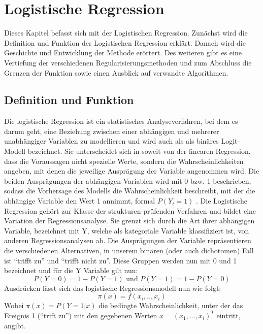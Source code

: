 \chapter{Logistische Regression}
Dieses Kapitel befasst sich mit der Logistischen Regression. Zunächst wird die Definition und Funktion der Logistischen Regression erklärt. Danach wird die Geschichte und Entwicklung der Methode erörtert. Des weiteren gibt es eine Vertiefung der verschiedenen Regularisierungsmethoden und zum Abschluss die Grenzen der Funktion sowie einen Ausblick auf verwandte Algorithmen.
\section{Definition und Funktion}
Die logistische Regression ist ein statistisches Analyseverfahren, bei dem es darum geht, eine Beziehung zwischen einer abhängigen und mehrerer unabhängiger Variablen zu modellieren und wird auch als als binäres Logit-Modell bezeichnet.
Sie unterscheidet sich in soweit von der linearen Regression, dass die Voraussagen nicht spezielle Werte, sondern die Wahrscheinlichkeiten angeben, mit denen die jeweilige Ausprägung der Variable angenommen wird.\cite{ROHR} Die beiden Ausprägungen der abhängigen Variablen wird mit 0 bzw. 1 beschrieben, sodass die Vorhersage des Modells die Wahrscheinlichkeit beschreibt, mit der die abhängige Variable den Wert 1 annimmt, formal $P(Y_i=1)$ . Die Logistische Regression gehört zur Klasse der strukturen-prüfenden Verfahren und bildet eine Variation der Regressionsanalyse. Sie grenzt sich durch die Art ihrer abhängigen Variable, bezeichnet mit Y, welche als kategoriale Variable klassifiziert ist, von anderen Regressionsanalysen ab. Die Ausprägungen der Variable repräsentieren die verschiedenen Alternativen, in unserem binären (oder auch dichotomen) Fall ist "`trifft zu"' und "`trifft nicht zu"'.\cite{BECK}
Diese Gruppen werden nun mit 0 und 1 bezeichnet und für die Y Variable gilt nun: 
\begin{displaymath}
P(Y=0)=1-P(Y=1)\text{ und } P(Y=1)=1-P(Y=0)
\end{displaymath}
Ausdrücken lässt sich das logistische Regressionsmodell nun wie folgt:
\begin{displaymath}
\pi(x) = f(x_{i},..,x_{i})
\end{displaymath}
Wobei $\pi(x)=P(Y=1|x)$ die bedingte Wahrscheinlichkeit, unter der das Ereignis 1 ("`trift zu"') mit den gegebenen Werten $x = (x_{1},...,x_{i})^{T}$ eintritt, angibt.\\\\
